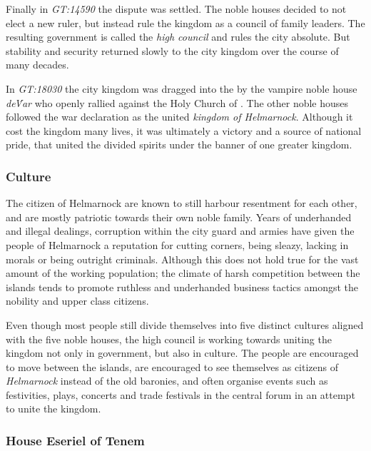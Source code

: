 Finally in \emph{GT:14590} the dispute was settled. The noble houses decided
to not elect a new ruler, but instead rule the kingdom as a council of family
leaders. The resulting government is called the \emph{high council} and rules
the city absolute. But stability and security returned slowly to the city
kingdom over the course of many decades.

In \emph{GT:18030} the city kingdom was dragged into the
 by the vampire noble house \emph{de\'Var} who openly
rallied against the Holy Church of . The other noble
houses followed the war declaration as the united \emph{kingdom of
  Helmarnock}. Although it cost the kingdom many lives, it was ultimately a
victory and a source of national pride, that united the divided spirits under
the banner of one greater kingdom.

\subsubsection*{Culture}


The citizen of Helmarnock are known to still harbour resentment for each other,
and are mostly patriotic towards their own noble family. Years of underhanded
and illegal dealings, corruption within the city guard and armies have given
the people of Helmarnock a reputation for cutting corners, being sleazy,
lacking in morals or being outright criminals. Although this does not hold
true for the vast amount of the working population; the climate of harsh
competition between the islands tends to promote ruthless and underhanded
business tactics amongst the nobility and upper class citizens.

Even though most people still divide themselves into five distinct cultures
aligned with the five noble houses, the high council is working towards
uniting the kingdom not only in government, but also in culture. The people
are encouraged to move between the islands, are encouraged to see themselves
as citizens of \emph{Helmarnock} instead of the old baronies, and often organise
events such as festivities, plays, concerts and trade festivals in the central
forum in an attempt to unite the kingdom.

\subsubsection*{House Eseriel of Tenem}
\label{sec:House Eseriel}

